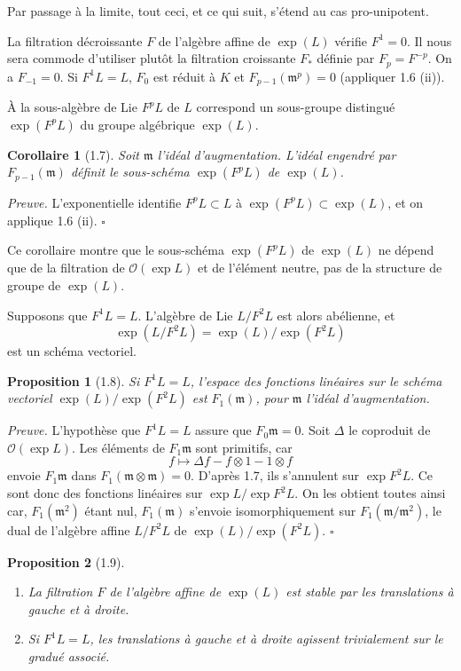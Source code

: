 \documentclass[10pt,a4paper]{article}
\newcommand{\OO}{\mathcal O}
\newcommand{\m}{\mathfrak m}
\theoremstyle{deligne}
\newtheorem*{proposition*}{Proposition}
\newtheorem*{corollary*}{Corollaire}
\newenvironment{proofdel}{\textit{Preuve.}}{\hfill$\square$}
\begin{document}
Par passage à la limite, tout ceci, et ce qui suit, s'étend au cas pro-unipotent.

La filtration décroissante \(F\) de l'algèbre affine de \(\exp(L)\) vérifie \(F^1=0\). Il nous sera commode d'utiliser plutôt la filtration croissante \(F_*\) définie par \(F_p=F^{-p}\). On a \(F_{-1}=0\). Si \(F^1L=L\), \(F_0\) est réduit à \(K\) et \(F_{p-1}(\m^p)=0\) (appliquer 1.6 (ii)).

À la sous-algèbre de Lie \(F^pL\) de \(L\) correspond un sous-groupe distingué \(\exp(F^pL)\) du groupe algébrique \(\exp(L)\).

\begin{corollary*}[1.7]
Soit \(\m\) l'idéal d'augmentation. L'idéal engendré par \(F_{p-1}(\m)\) définit le sous-schéma \(\exp(F^pL)\) de \(\exp(L)\).
\end{corollary*}

\begin{proofdel}
L'exponentielle identifie \(F^pL\subset L\) à \(\exp(F^pL)\subset\exp(L)\), et on applique 1.6 (ii).
\end{proofdel}

Ce corollaire montre que le sous-schéma \(\exp(F^pL)\) de \(\exp(L)\) ne dépend que de la filtration de \(\OO(\exp L)\) et de l'élément neutre, pas de la structure de groupe de \(\exp(L)\).

Supposons que \(F^1L=L\). L'algèbre de Lie \(L/F^2L\) est alors abélienne, et
\[
\exp(L/F^2L)=\exp(L)/\exp(F^2L)
\]
est un schéma vectoriel.

\begin{proposition*}[1.8]
Si \(F^1L=L\), l'espace des fonctions linéaires sur le schéma vectoriel \(\exp(L)/\exp(F^2L)\) est \(F_1(\m)\), pour \(\m\) l'idéal d'augmentation.
\end{proposition*}

\begin{proofdel}
L'hypothèse que \(F^1L=L\) assure que \(F_0\m=0\). Soit \(\Delta\) le coproduit de \(\OO(\exp L)\). Les éléments de \(F_1\m\) sont primitifs, car
\[
f\longmapsto \Delta f-f\otimes1-1\otimes f
\]
envoie \(F_1\m\) dans \(F_1(\m\otimes\m)=0\). D'après 1.7, ils s'annulent sur \(\exp F^2L\). Ce sont donc des fonctions linéaires sur \(\exp L/\exp F^2L\). On les obtient toutes ainsi car, \(F_1(\m^2)\) étant nul, \(F_1(\m)\) s'envoie isomorphiquement sur \(F_1(\m/\m^2)\), le dual de l'algèbre affine \(L/F^2L\) de \(\exp(L)/\exp(F^2L)\).
\end{proofdel}

\begin{proposition*}[1.9]
\begin{enumerate}[label=(\roman*)]
\item La filtration \(F\) de l'algèbre affine de \(\exp(L)\) est stable par les translations à gauche et à droite.
\item Si \(F^1L=L\), les translations à gauche et à droite agissent trivialement sur le gradué associé.
\end{enumerate}
\end{proposition*}
\end{document}

